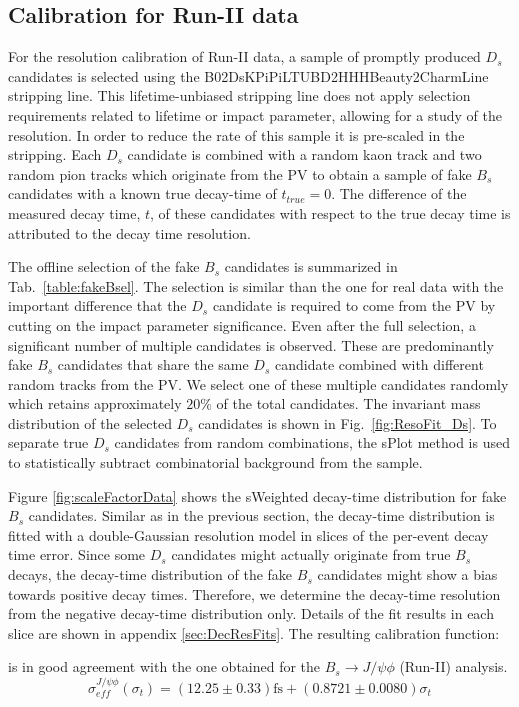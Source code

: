 \subsection{Calibration for Run-II data }

For the resolution calibration of Run-II data, a sample of promptly produced $D_s$ candidates is selected
using the \textsf{B02DsKPiPiLTUBD2HHHBeauty2CharmLine} stripping line.
This lifetime-unbiased stripping line does not apply selection requirements related to lifetime or impact parameter, allowing for a study of the resolution. 
In order to reduce the rate of this sample it is pre-scaled in the stripping.
Each $D_s$ candidate is combined with a random kaon track and two random pion tracks which originate from the PV to obtain a sample of fake $B_s$ candidates with a known true decay-time of $t_{true} = 0$. 
The difference of the measured decay time, $t$, of these candidates with respect to the true decay time is attributed to the decay time resolution. 


The offline selection of the fake $B_s$ candidates is summarized in Tab.~\ref{table:fakeBsel}.
The selection is similar than the one for real data with the important difference that the $D_s$ candidate is required to come from the PV by cutting on the impact parameter significance.
Even after the full selection, a significant number of multiple candidates is observed.
These are predominantly fake $B_s$ candidates that share the same $D_s$ candidate combined with different random tracks from the PV.
We select one of these multiple candidates randomly which retains approximately $20\%$ of the total candidates.
The invariant mass distribution of the selected $D_s$ candidates is shown in Fig.~\ref{fig:ResoFit_Ds}.
To separate true $D_s$ candidates from random combinations, the \textsf{sPlot} method is used to statistically subtract combinatorial background from the sample.

Figure \ref{fig:scaleFactorData} shows the \textsf{sWeighted} decay-time distribution for fake $B_s$ candidates.
Similar as in the previous section, the decay-time distribution is fitted with a double-Gaussian resolution model in slices of the per-event decay time error.
Since some $D_s$ candidates might actually originate from true $B_s$ decays, the decay-time distribution of the fake $B_s$ candidates 
might show a bias towards positive decay times. 
Therefore, we determine the decay-time resolution from the negative decay-time distribution only.
Details of the fit results in each slice are shown in appendix \ref{sec:DecResFits}. 
The resulting calibration function:

is in good agreement with the one obtained for the $B_s \to J/\psi \phi$ (Run-II) analysis. 
\begin{equation}
\sigma_{eff}^{J/\psi\phi}(\sigma_t) = \left( 12.25 \pm 0.33 \right) \text{fs} + \left( 0.8721 \pm 0.0080 \right) \sigma_t
\label{eq:scaleFactorJpsiPhi}
\end{equation}

